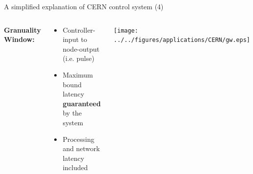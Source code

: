 \documentclass[compress,red]{beamer}
\begin{document}
\begin{frame}{A simplified explanation of CERN control system (4)}

\begin{columns}[c]
   {\bf Granuality Window: }
    \begin{center}
      \begin{itemize}
	    \item Controller-input to node-output (i.e. pulse)
	    \item Maximum bound latency {\bf guaranteed } by the system
	    \item Processing and network latency included
      \end{itemize}

    \end{center}
    \begin{center}
      \begin{center}
      \texttt{[image: ../../figures/applications/CERN/gw.eps]}
      \end{center}
    \end{center}
\end{columns}

\end{frame}
\end{document}
